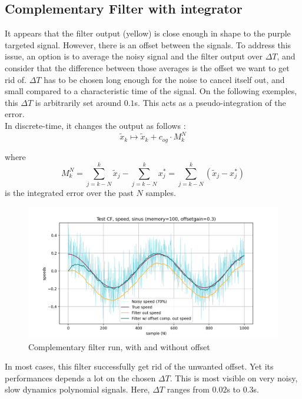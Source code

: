 \documentclass[a4paper,10pt]{article}
\begin{document}
\subsection{Complementary Filter with integrator}
\label{complementary filter integrator}
It appears that the filter output (yellow) is close enough in shape to the purple targeted signal. However, there is an offset between the signals.
To address this issue, an option is to average the noisy signal and the filter output over $\Delta T$, and consider that the difference between those averages is the offset we want to get rid of. $\Delta T$ has to be chosen long enough for the noise to cancel itself out, and small compared to a characteristic time of the signal. On the following exemples, this $\Delta T$ is arbitrarily set around $0.1$s. This acts as a pseudo-integration of the error.\\
In discrete-time, it changes the output as follows :
$$\widetilde{x}_k \mapsto \widetilde{x}_k + c_{og} \cdot M_k^N$$

where $$M_k^N = \sum_{j=k-N}^{k}\widetilde{x}_j - \sum_{j=k-N}^{k}x_j^* = \sum_{j=k-N}^{k}(\widetilde{x}_j - x_j^*) $$
is the integrated error over the past $N$ samples. 


\begin{figure}[H]
\label{fig:complementary_filter_run_offset}
\centering
  \includegraphics[width=\linewidth, angle=0, scale=0.8]{./images/TestCF_run8_sinus.png}
  \caption{Complementary filter run, with and without offset}
\end{figure}

In most cases, this filter successfully get rid of the unwanted offset. Yet its performances depends a lot on the chosen $\Delta T$. This is most visible on very noisy, slow dynamics polynomial signals. Here, $\Delta T$ ranges from $0.02$s to $0.3$s.
\end{document}
